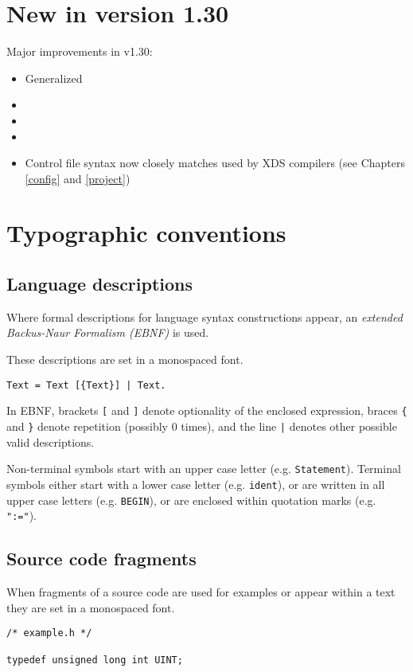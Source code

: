 \section{New in version 1.30}

Major improvements in v1.30:

\begin{itemize}
\item Generalized 
\item {}
\item {}
\item {}
\item Control file syntax now closely matches used by XDS compilers
      (see Chapters \ref{config} and \ref{project})
\end{itemize}

\section{Typographic conventions}
\label{intro:conv}

\subsection{Language descriptions}
\label{intro:conv:EBNF}

Where formal descriptions for language syntax constructions appear, an
{\em extended Backus-Naur Formalism (EBNF)} is used.

These descriptions are set in a monospaced font.

\begin{verbatim}
Text = Text [{Text}] | Text.
\end{verbatim}

In EBNF, brackets \verb+[+ and \verb+]+ denote optionality of the
enclosed expression, braces \verb+{+ and \verb+}+ denote repetition
(possibly 0 times), and the line \verb+|+ denotes other possible valid
descriptions.

Non-terminal symbols start with an upper case letter (e.g. \verb+Statement+).
Terminal symbols either start with a lower case letter (e.g. \verb+ident+), or are
written in all upper case letters (e.g. \verb+BEGIN+), or are enclosed within
quotation marks (e.g. \verb+":="+).

\subsection{Source code fragments}
\label{intro:conv:cource}

When fragments of a source code are used for examples or appear within
a text they are set in a monospaced font.

\begin{verbatim}
/* example.h */

typedef unsigned long int UINT;
\end{verbatim}

